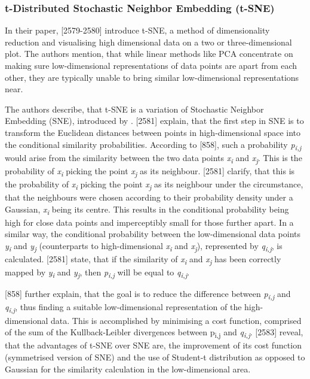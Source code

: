 \subsubsection{t-Distributed Stochastic Neighbor Embedding (t-SNE)}
\label{section:tSNE}
In their paper, \textcite{maaten2008visualizing}[2579-2580] introduce t-SNE, a method of dimensionality reduction and visualising high dimensional data on a two or three-dimensional plot. The authors mention, that while linear methods like PCA concentrate on making sure low-dimensional representations of data points are apart from each other, they are typically unable to bring similar low-dimensional representations near. 

The authors describe, that t-SNE is a variation of Stochastic Neighbor Embedding (SNE), introduced by \textcite{hinton2003stochastic}. \textcite{maaten2008visualizing}[2581] explain, that the first step in SNE is to transform the Euclidean distances between points in high-dimensional space into the conditional similarity probabilities. According to \textcite{hinton2003stochastic}[858], such a probability \textit{p\textsubscript{i,j}} would arise from the similarity between the two data points \textit{x\textsubscript{i}} and \textit{x\textsubscript{j}}. This is the probability of \textit{x\textsubscript{i}} picking the point \textit{x\textsubscript{j}} as its neighbour. \textcite{maaten2008visualizing}[2581] clarify, that this is the probability of \textit{x\textsubscript{i}} picking the point \textit{x\textsubscript{j}} as its neighbour under the circumstance, that the neighbours were chosen according to their probability density under a Gaussian, \textit{x\textsubscript{i}} being its centre. This results in the conditional probability being high for close data points and imperceptibly small for those further apart.
In a similar way, the conditional probability between the low-dimensional data points \textit{y\textsubscript{i}} and \textit{y\textsubscript{j}} (counterparts to high-dimensional \textit{x\textsubscript{i}} and \textit{x\textsubscript{j}}), represented by \textit{q\textsubscript{i,j}}, is calculated. 
\textcite{maaten2008visualizing}[2581] state, that if the similarity of \textit{x\textsubscript{i}} and \textit{x\textsubscript{j}} has been correctly mapped by \textit{y\textsubscript{i}} and \textit{y\textsubscript{j}}, then \textit{p\textsubscript{i,j}} will be equal to \textit{q\textsubscript{i,j}}. 

\textcite{hinton2003stochastic}[858] further explain, that the goal is to reduce the difference between \textit{p\textsubscript{i,j}} and \textit{q\textsubscript{i,j}}, thus finding a suitable low-dimensional representation of the high-dimensional data. This is accomplished by minimising a cost function, comprised of the sum of the Kullback-Leibler divergences between {p\textsubscript{i,j}} and \textit{q\textsubscript{i,j}}. 
\textcite{maaten2008visualizing}[2583] reveal, that the advantages of t-SNE over SNE are, the improvement of its cost function (symmetrised version of SNE) and the use of Student-t distribution as opposed to Gaussian for the similarity calculation in the low-dimensional area.

